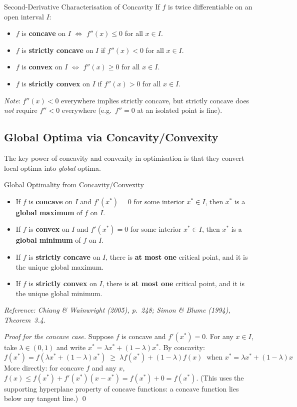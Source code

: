 \documentclass[12pt, a4paper]{article}
\theoremstyle{definition}
\begin{document}
\begin{thmbox}{Second-Derivative Characterisation of Concavity}
If $f$ is twice differentiable on an open interval $I$:
\begin{itemize}
  \item $f$ is \textbf{concave} on $I$ $\iff$ $f''(x) \leq 0$ for all
        $x \in I$.
  \item $f$ is \textbf{strictly concave} on $I$ if $f''(x) < 0$ for all
        $x \in I$.
  \item $f$ is \textbf{convex} on $I$ $\iff$ $f''(x) \geq 0$ for all
        $x \in I$.
  \item $f$ is \textbf{strictly convex} on $I$ if $f''(x) > 0$ for all
        $x \in I$.
\end{itemize}
\emph{Note}: $f''(x) < 0$ everywhere implies strictly concave, but strictly
concave does \emph{not} require $f''<0$ everywhere (e.g.\ $f''=0$ at an
isolated point is fine).
\end{thmbox}

\subsection{Global Optima via Concavity/Convexity}

The key power of concavity and convexity in optimisation is that they convert
local optima into \emph{global} optima.

\begin{thmbox}{Global Optimality from Concavity/Convexity}
\begin{itemize}
  \item If $f$ is \textbf{concave} on $I$ and $f'(x^*)=0$ for some
        interior $x^* \in I$, then $x^*$ is a \textbf{global maximum} of
        $f$ on $I$.
  \item If $f$ is \textbf{convex} on $I$ and $f'(x^*)=0$ for some
        interior $x^* \in I$, then $x^*$ is a \textbf{global minimum} of
        $f$ on $I$.
  \item If $f$ is \textbf{strictly concave} on $I$, there is \textbf{at
        most one} critical point, and it is the unique global maximum.
  \item If $f$ is \textbf{strictly convex} on $I$, there is \textbf{at
        most one} critical point, and it is the unique global minimum.
\end{itemize}
\emph{Reference: Chiang \& Wainwright (2005), p.\ 248;
Simon \& Blume (1994), Theorem~3.4.}
\end{thmbox}
\newpage
\begin{proof}[Proof for the concave case]
Suppose $f$ is concave and $f'(x^*)=0$.  For any $x \in I$, take
$\lambda \in (0,1)$ and write $x^* = \lambda x^* + (1-\lambda)x^*$.
By concavity:
\[
  f(x^*) = f(\lambda x^* + (1-\lambda)x^*)
  \; \geq \; \lambda f(x^*) + (1-\lambda)f(x)
  \;\; \text{when } x^* = \lambda x^* + (1-\lambda)x
\]
More directly: for concave $f$ and any $x$,
$f(x) \leq f(x^*) + f'(x^*)(x-x^*) = f(x^*) + 0 = f(x^*)$.
(This uses the supporting hyperplane property of concave functions:
a concave function lies below any tangent line.) \qed
\end{proof}
\end{document}

